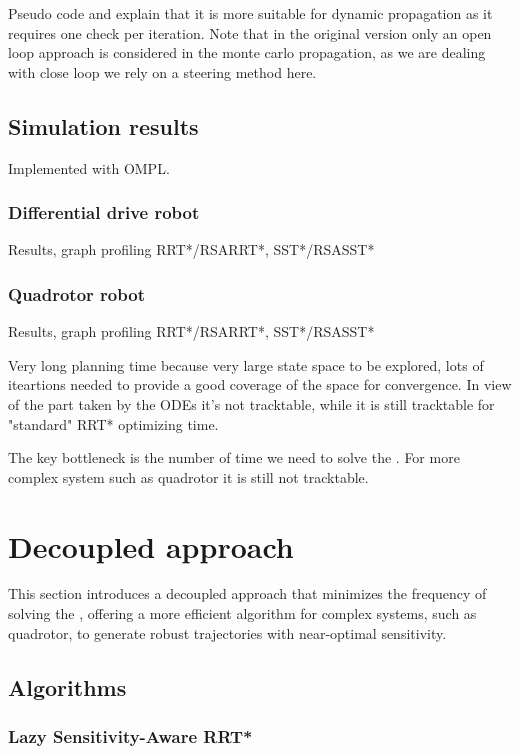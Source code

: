Pseudo code and explain that it is more suitable for dynamic propagation as it requires one check per iteration.
Note that in the original version only an open loop approach is considered in the monte carlo propagation, as we are dealing with close loop we rely on a steering method here.

\subsection{Simulation results}\label{sec:samp_simu}
Implemented with OMPL.
\subsubsection{Differential drive robot}
Results, graph profiling RRT*/RSARRT*, SST*/RSASST*
\subsubsection{Quadrotor robot}
Results, graph profiling RRT*/RSARRT*, SST*/RSASST*

Very long planning time because very large state space to be explored, lots of iteartions needed to provide a good coverage of the space for convergence.
In view of the part taken by the ODEs it's not tracktable, while it is still tracktable for "standard" RRT* optimizing time.

The key bottleneck is the number of time we need to solve the . 
For more complex system such as quadrotor it is still not tracktable.

\section{Decoupled approach}\label{sec:decoupled}

This section introduces a decoupled approach that minimizes the frequency of solving the , offering a more efficient algorithm for complex systems, such as quadrotor, to generate robust trajectories with near-optimal sensitivity.

\subsection{Algorithms}
\subsubsection{Lazy Sensitivity-Aware RRT*}

